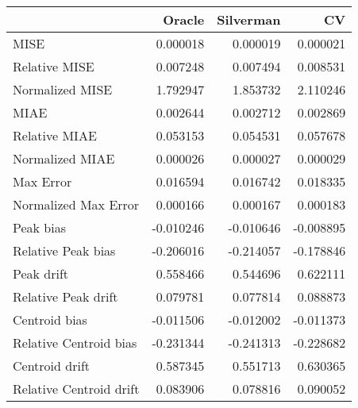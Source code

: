 \begin{tabular}{lrrr}
  \hline
 & Oracle & Silverman & CV \\ 
  \hline
MISE & 0.000018 & 0.000019 & 0.000021 \\ 
  Relative MISE & 0.007248 & 0.007494 & 0.008531 \\ 
  Normalized MISE & 1.792947 & 1.853732 & 2.110246 \\ 
  MIAE & 0.002644 & 0.002712 & 0.002869 \\ 
  Relative MIAE & 0.053153 & 0.054531 & 0.057678 \\ 
  Normalized MIAE & 0.000026 & 0.000027 & 0.000029 \\ 
  Max Error & 0.016594 & 0.016742 & 0.018335 \\ 
  Normalized Max Error & 0.000166 & 0.000167 & 0.000183 \\ 
  Peak bias & -0.010246 & -0.010646 & -0.008895 \\ 
  Relative Peak bias & -0.206016 & -0.214057 & -0.178846 \\ 
  Peak drift & 0.558466 & 0.544696 & 0.622111 \\ 
  Relative Peak drift & 0.079781 & 0.077814 & 0.088873 \\ 
  Centroid bias & -0.011506 & -0.012002 & -0.011373 \\ 
  Relative Centroid bias & -0.231344 & -0.241313 & -0.228682 \\ 
  Centroid drift & 0.587345 & 0.551713 & 0.630365 \\ 
  Relative Centroid drift & 0.083906 & 0.078816 & 0.090052 \\ 
   \hline
\end{tabular}
